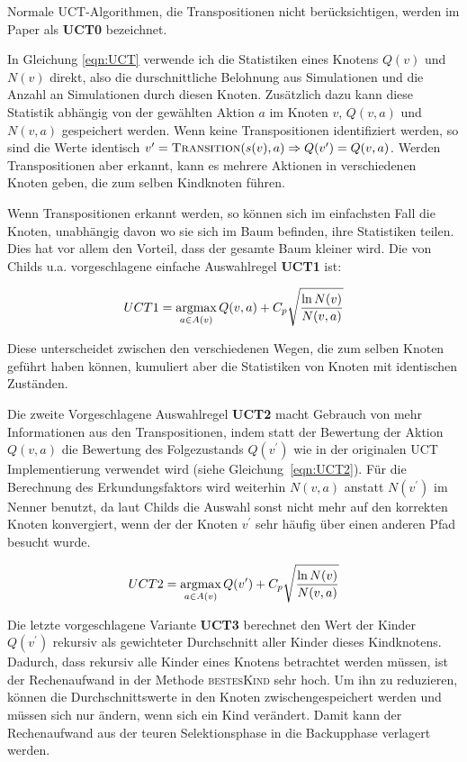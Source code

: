 Normale UCT-Algorithmen, die Transpositionen nicht berücksichtigen, werden im Paper als \textbf{UCT0} bezeichnet. 

In Gleichung \ref{eqn:UCT} verwende ich die Statistiken eines Knotens $Q(v)$ und $N(v)$ direkt, also die durschnittliche Belohnung aus Simulationen und die Anzahl an Simulationen durch diesen Knoten. Zusätzlich dazu kann diese Statistik abhängig von der gewählten Aktion $a$ im Knoten $v$, $Q(v,a)$ und $N(v,a)$ gespeichert werden. Wenn keine Transpositionen identifiziert werden, so sind die Werte identisch $v^\prime = \textsc{Transition}(s(v),a) \Rightarrow Q(v^\prime) = Q(v,a)$. Werden Transpositionen aber erkannt, kann es mehrere Aktionen in verschiedenen Knoten geben, die zum selben Kindknoten führen.

Wenn Transpositionen erkannt werden, so können sich im einfachsten Fall die Knoten, unabhängig davon wo sie sich im Baum befinden, ihre Statistiken teilen. Dies hat vor allem den Vorteil, dass der gesamte Baum kleiner wird. Die von Childs u.a. vorgeschlagene einfache Auswahlregel \textbf{UCT1} ist:

\begin{equation}
UCT1 = \operatorname*{argmax}_{a \in A(v)} Q(v,a) + C_p\sqrt{\frac{\ln N(v)}{N(v,a)}}
\label{eqn:UCT1}
\end{equation}

Diese unterscheidet zwischen den verschiedenen Wegen, die zum selben Knoten geführt haben können, kumuliert aber die Statistiken von Knoten mit identischen Zuständen. 

Die zweite Vorgeschlagene Auswahlregel \textbf{UCT2} macht Gebrauch von mehr Informationen aus den Transpositionen, indem statt der Bewertung der Aktion $Q(v,a)$ die Bewertung des Folgezustands $Q(v^\prime)$ wie in der originalen UCT Implementierung verwendet wird (siehe Gleichung~\ref{eqn:UCT2}). Für die Berechnung des Erkundungsfaktors wird weiterhin $N(v,a)$ anstatt $N(v^\prime)$ im Nenner benutzt, da laut Childs die Auswahl sonst nicht mehr auf den korrekten Knoten konvergiert, wenn der der Knoten $v^\prime$ sehr häufig über einen anderen Pfad besucht wurde.\autocite[\ppno~390]{childsTranspositionsMoveGroups2008}

\begin{equation}
UCT2 = \operatorname*{argmax}_{a \in A(v)} Q(v^\prime) + C_p\sqrt{\frac{\ln N(v)}{N(v,a)}}
\label{eqn:UCT2}
\end{equation}

Die letzte vorgeschlagene Variante \textbf{UCT3} berechnet den Wert der Kinder $Q(v^\prime)$ rekursiv als gewichteter Durchschnitt aller Kinder dieses Kindknotens. Dadurch, dass rekursiv alle Kinder eines Knotens betrachtet werden müssen, ist der Rechenaufwand in der Methode \textsc{bestesKind} sehr hoch. Um ihn zu reduzieren, können die Durchschnittswerte in den Knoten zwischengespeichert werden und müssen sich nur ändern, wenn sich ein Kind verändert. Damit kann der Rechenaufwand aus der teuren Selektionsphase in die Backupphase verlagert werden.


